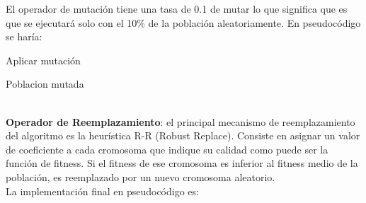 El operador de mutación tiene una tasa de 0.1 de mutar lo que significa que es que se ejecutará solo con el 10\% de la población aleatoriamente. En pseudocódigo se haría:\\
\begin{algorithm}[H]
	\caption{Aplicar mutación}
	
	
	\BlankLine
	\BlankLine
	\BlankLine
	\Return Poblacion mutada\;
\end{algorithm}
\quad\\

\textbf{Operador de Reemplazamiento}: el principal mecanismo de reemplazamiento del algoritmo es la heurística R-R (Robust Replace). Consiste en asignar un valor de coeficiente a cada cromosoma que indique su calidad como puede ser la función de fitness. Si el fitness de ese cromosoma es inferior al fitness medio de la población, es reemplazado por un nuevo cromosoma aleatorio. \\

La implementación final en pseudocódigo es:

